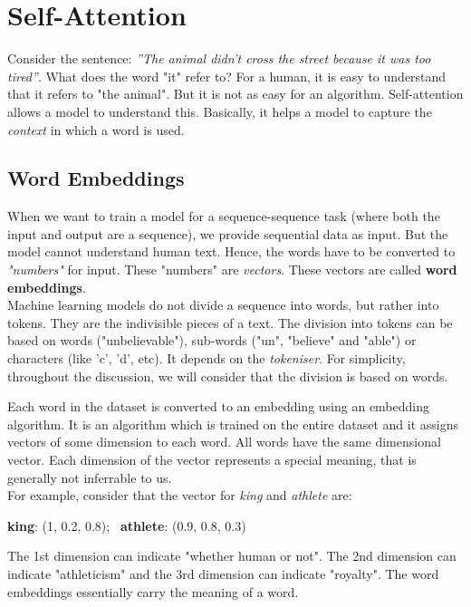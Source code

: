 \chapter{Self-Attention}

Consider the sentence: \textit{”The animal didn't cross the street because it was too tired”}. What does the word "it" refer to? For a human, it is easy to understand that it refers to "the animal". But it is not as easy for an algorithm. Self-attention allows a model to understand this. Basically, it helps a model to capture the \textit{context} in which a word is used.

\section{Word Embeddings}

When we want to train a model for a sequence-sequence task (where both the input and output are a sequence), we provide sequential data as input. But the model cannot understand human text. Hence, the words have to be converted to \textit{"numbers"} for input. These "numbers" are \textit{vectors}. These vectors are called \textbf{word embeddings}.\\

Machine learning models do not divide a sequence into words, but rather into tokens. They are the indivisible pieces of a text. The division into tokens can be based on words ("unbelievable"), sub-words ("un", "believe" and "able") or characters (like 'c', 'd', etc). It depends on the \textit{tokeniser}. For simplicity, throughout the discussion, we will consider that the division is based on words.

Each word in the dataset is converted to an embedding using an embedding algorithm. It is an algorithm which is trained on the entire dataset and it assigns vectors of some dimension to each word. All words have the same dimensional vector. Each dimension of the vector represents a special meaning, that is generally not inferrable to us.\\

For example, consider that the vector for \textit{king} and \textit{athlete} are:
\begin{center}
    \textbf{king}: (1, 0.2, 0.8); \ \textbf{athlete}: (0.9, 0.8, 0.3)
\end{center}

The 1st dimension can indicate "whether human or not". The 2nd dimension can indicate "athleticism" and the 3rd dimension can indicate "royalty". The word embeddings essentially carry the meaning of a word.\\

